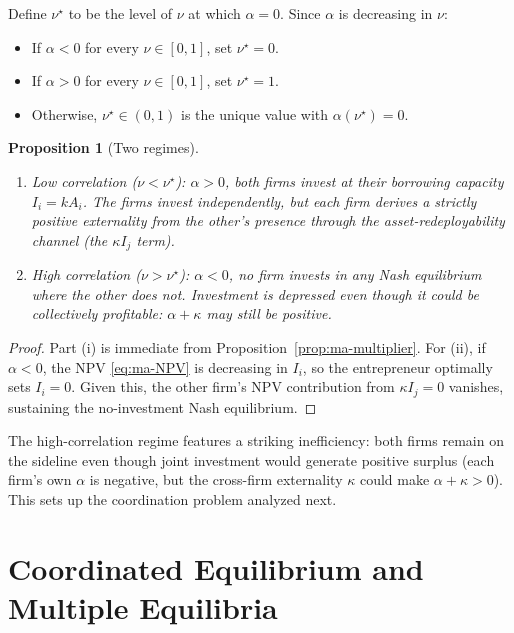 \documentclass[11pt,a4paper,oneside]{book}
\theoremstyle{plain}
\newtheorem{proposition}[theorem]{Proposition}
\theoremstyle{definition}
\theoremstyle{remark}
\numberwithin{equation}{chapter}
\begin{document}
Define $\nu^\star$ to be the level of $\nu$ at which $\alpha = 0$.
Since $\alpha$ is decreasing in $\nu$:
\begin{itemize}
  \item If $\alpha < 0$ for every $\nu \in [0, 1]$, set $\nu^\star = 0$.
  \item If $\alpha > 0$ for every $\nu \in [0, 1]$, set $\nu^\star = 1$.
  \item Otherwise, $\nu^\star \in (0, 1)$ is the unique value with $\alpha(\nu^\star) = 0$.
\end{itemize}

\begin{proposition}[Two regimes]\label{prop:ma-two-regimes}
\begin{enumerate}
  \item[\textup{(i)}] \emph{Low correlation} ($\nu < \nu^\star$): $\alpha > 0$, both firms invest at their borrowing capacity $I_i = k A_i$.
  The firms invest independently, but each firm derives a strictly positive externality from the other's presence through the asset-redeployability channel (the $\kappa I_j$ term).
  \item[\textup{(ii)}] \emph{High correlation} ($\nu > \nu^\star$): $\alpha < 0$, no firm invests in any Nash equilibrium where the other does not.
  Investment is depressed even though it could be collectively profitable: $\alpha + \kappa$ may still be positive.
\end{enumerate}
\end{proposition}

\begin{proof}
Part (i) is immediate from Proposition~\ref{prop:ma-multiplier}.
For (ii), if $\alpha < 0$, the NPV \eqref{eq:ma-NPV} is decreasing in $I_i$, so the entrepreneur optimally sets $I_i = 0$.
Given this, the other firm's NPV contribution from $\kappa I_j = 0$ vanishes, sustaining the no-investment Nash equilibrium.
\end{proof}

The high-correlation regime features a striking inefficiency: both firms remain on the sideline even though joint investment would generate positive surplus (each firm's own $\alpha$ is negative, but the cross-firm externality $\kappa$ could make $\alpha + \kappa > 0$).
This sets up the coordination problem analyzed next.

\section{Coordinated Equilibrium and Multiple Equilibria}
\label{sec:ma-coordination}
\end{document}

